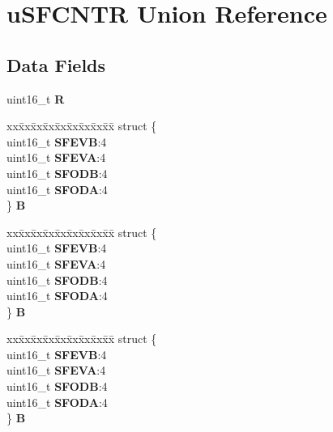 \hypertarget{unionuSFCNTR}{}\section{u\+S\+F\+C\+N\+TR Union Reference}
\label{unionuSFCNTR}
\subsection*{Data Fields}
\begin{DoxyCompactItemize}
\item 
\mbox{\label{unionuSFCNTR_a6f80a7ffb041bc370a624d0a7c0104fc}} 
uint16\+\_\+t {\bfseries R}
\item 
\mbox{\label{unionuSFCNTR_a8cc3ec9fd26700ded074a01a120f30cc}} 
\begin{tabbing}
xx\=xx\=xx\=xx\=xx\=xx\=xx\=xx\=xx\=\kill
struct \{\\
\>uint16\_t {\bfseries SFEVB}:4\\
\>uint16\_t {\bfseries SFEVA}:4\\
\>uint16\_t {\bfseries SFODB}:4\\
\>uint16\_t {\bfseries SFODA}:4\\
\} {\bfseries B}\\

\end{tabbing}\item 
\mbox{\label{unionuSFCNTR_a86d2153b5d1ce7296633ae9a90cc1035}} 
\begin{tabbing}
xx\=xx\=xx\=xx\=xx\=xx\=xx\=xx\=xx\=\kill
struct \{\\
\>uint16\_t {\bfseries SFEVB}:4\\
\>uint16\_t {\bfseries SFEVA}:4\\
\>uint16\_t {\bfseries SFODB}:4\\
\>uint16\_t {\bfseries SFODA}:4\\
\} {\bfseries B}\\

\end{tabbing}\item 
\mbox{\label{unionuSFCNTR_a6f17de9a8f1a993a6987f75f347d12a8}} 
\begin{tabbing}
xx\=xx\=xx\=xx\=xx\=xx\=xx\=xx\=xx\=\kill
struct \{\\
\>uint16\_t {\bfseries SFEVB}:4\\
\>uint16\_t {\bfseries SFEVA}:4\\
\>uint16\_t {\bfseries SFODB}:4\\
\>uint16\_t {\bfseries SFODA}:4\\
\} {\bfseries B}\\


\end{tabbing}
\end{DoxyCompactItemize}
